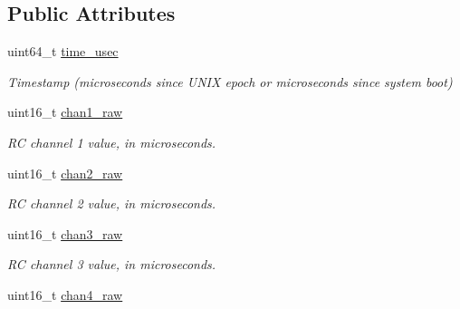 \subsection*{Public Attributes}
\begin{DoxyCompactItemize}
\item 
\hypertarget{struct____mavlink__hil__rc__inputs__raw__t_a17665e54cab99a69ff2e6d3b8ae63928}{uint64\+\_\+t \hyperlink{struct____mavlink__hil__rc__inputs__raw__t_a17665e54cab99a69ff2e6d3b8ae63928}{time\+\_\+usec}}\label{struct____mavlink__hil__rc__inputs__raw__t_a17665e54cab99a69ff2e6d3b8ae63928}

\begin{DoxyCompactList}\small\item\em Timestamp (microseconds since U\+N\+I\+X epoch or microseconds since system boot) \end{DoxyCompactList}\item 
\hypertarget{struct____mavlink__hil__rc__inputs__raw__t_a1c71d0b0abbff7055c0753a8b8a116bc}{uint16\+\_\+t \hyperlink{struct____mavlink__hil__rc__inputs__raw__t_a1c71d0b0abbff7055c0753a8b8a116bc}{chan1\+\_\+raw}}\label{struct____mavlink__hil__rc__inputs__raw__t_a1c71d0b0abbff7055c0753a8b8a116bc}

\begin{DoxyCompactList}\small\item\em R\+C channel 1 value, in microseconds. \end{DoxyCompactList}\item 
\hypertarget{struct____mavlink__hil__rc__inputs__raw__t_a0210c7a3752c816e694c38e9fa85b8ed}{uint16\+\_\+t \hyperlink{struct____mavlink__hil__rc__inputs__raw__t_a0210c7a3752c816e694c38e9fa85b8ed}{chan2\+\_\+raw}}\label{struct____mavlink__hil__rc__inputs__raw__t_a0210c7a3752c816e694c38e9fa85b8ed}

\begin{DoxyCompactList}\small\item\em R\+C channel 2 value, in microseconds. \end{DoxyCompactList}\item 
\hypertarget{struct____mavlink__hil__rc__inputs__raw__t_a4f05c2ed52ec8aed527bc31331f74247}{uint16\+\_\+t \hyperlink{struct____mavlink__hil__rc__inputs__raw__t_a4f05c2ed52ec8aed527bc31331f74247}{chan3\+\_\+raw}}\label{struct____mavlink__hil__rc__inputs__raw__t_a4f05c2ed52ec8aed527bc31331f74247}

\begin{DoxyCompactList}\small\item\em R\+C channel 3 value, in microseconds. \end{DoxyCompactList}\item 
\hypertarget{struct____mavlink__hil__rc__inputs__raw__t_a762888a4e5d0273d9042bd1924c8b95b}{uint16\+\_\+t \hyperlink{struct____mavlink__hil__rc__inputs__raw__t_a762888a4e5d0273d9042bd1924c8b95b}{chan4\+\_\+raw}}\label{struct____mavlink__hil__rc__inputs__raw__t_a762888a4e5d0273d9042bd1924c8b95b}


\end{DoxyCompactItemize}
